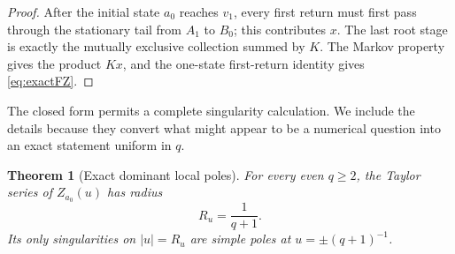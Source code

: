 \documentclass[11pt,reqno]{amsart}
\numberwithin{equation}{section}
\newtheorem{theorem}{Theorem}[section]
\theoremstyle{definition}
\theoremstyle{remark}
\begin{document}
\begin{proof}
After the initial state $a_0$ reaches $v_1$, every first return must first pass
through the stationary tail from $A_1$ to $B_0$; this contributes $x$.  The
last root stage is exactly the mutually exclusive collection summed by $K$.
The Markov property gives the product $Kx$, and the one-state first-return
identity gives \eqref{eq:exactFZ}.
\end{proof}

The closed form permits a complete singularity calculation.  We include the
details because they convert what might appear to be a numerical question into
an exact statement uniform in $q$.

\begin{theorem}[Exact dominant local poles]
\label{thm:exact-dominant-pole}
For every even $q\ge2$, the Taylor series of $Z_{a_0}(u)$ has radius
\begin{equation}\label{eq:exact-local-radius}
 R_u=\frac1{q+1}.
\end{equation}
Its only singularities on $|u|=R_u$ are simple poles at
$u=\pm(q+1)^{-1}$.
\end{theorem}
\end{document}
